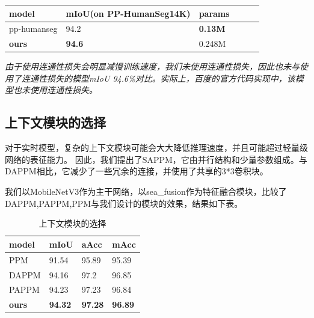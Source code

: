\documentclass[11pt]{article}
\begin{document}
\begin{table}[H]
  \centering
  \begin{tabular}{|l|l|l|l|l|l|}
  \hline
      model & mIoU(on PP-HumanSeg14K) & params \\ \hline
      pp-humanseg&94.2&\textbf{0.13M}\\\hline
      \textbf{ours}&\textbf{94.6}&0.248M\\\hline
  \end{tabular}
\end{table}

\textit{由于使用连通性损失会明显减慢训练速度，我们未使用连通性损失，因此也未与使用了连通性损失的模型mIoU 94.6\%对比。实际上，百度的官方代码实现中，该模型也未使用连通性损失。}


\subsection{上下文模块的选择}

对于实时模型，复杂的上下文模块可能会大大降低推理速度，并且可能超过轻量级网络的表征能力。
因此，我们提出了SAPPM，它由并行结构和少量参数组成。与DAPPM相比，它减少了一些冗余的连接，并使用了共享的3*3卷积块。

我们以MobileNetV3作为主干网络，以sea_fusion作为特征融合模块，比较了DAPPM,PAPPM,PPM与我们设计的模块的效果，结果如下表。
\begin{table}[!ht]
  \centering
  \begin{tabular}{|l|l|l|l|}
  \hline
      model & mIoU & aAcc & mAcc \\ \hline
      PPM & 91.54 & 95.89 & 95.39 \\ \hline
      DAPPM & 94.16 & 97.2 & 96.85 \\ \hline
      PAPPM & 94.23 & 97.23 & 96.84 \\ \hline
      \textbf{ours} & \textbf{94.32} & \textbf{97.28} & \textbf{96.89} \\ \hline
  \end{tabular}
\caption{上下文模块的选择}
  \label{fig:01}
\end{table}
\end{document}
